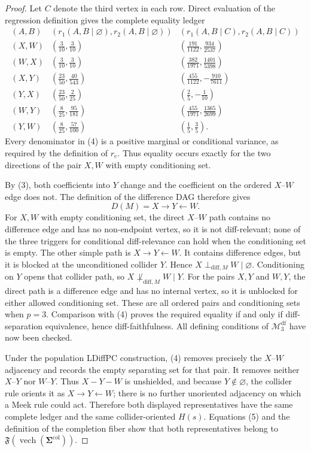 \documentclass{article}
\begin{document}
\begin{proof}
Let \(C\) denote the third vertex in each row. Direct evaluation of the regression definition gives the complete equality ledger
\[
\begin{array}{c|c|c}
 (A,B)&(r_1(A,B\mid\varnothing),r_2(A,B\mid\varnothing))
 &(r_1(A,B\mid C),r_2(A,B\mid C))\\ \hline
 (X,W)&(\frac3{10},\frac3{10})&(\frac{191}{1122},\frac{934}{2537})\\
 (W,X)&(\frac3{10},\frac3{10})&(\frac{382}{1971},\frac{1401}{5398})\\
 (X,Y)&(\frac{23}{50},\frac{40}{543})&(\frac{455}{1122},-\frac{910}{7611})\\
 (Y,X)&(\frac{23}{50},\frac2{25})&(\frac25,-\frac1{10})\\
 (W,Y)&(\frac8{25},\frac{95}{181})&(\frac{455}{1971},\frac{1365}{2699})\\
 (Y,W)&(\frac8{25},\frac{57}{100})&(\frac15,\frac35).
\end{array}
\tag{4}
\]
Every denominator in (4) is a positive marginal or conditional variance, as required by the definition of \(r_e\). Thus equality occurs exactly for the two directions of the pair \(X,W\) with empty conditioning set.

By (3), both coefficients into \(Y\) change and the coefficient on the ordered \(X\)--\(W\) edge does not. The definition of the difference DAG therefore gives
\[
 D(M)=X\longrightarrow Y\longleftarrow W.
 \tag{5}
\]
For \(X,W\) with empty conditioning set, the direct \(X\)--\(W\) path contains no difference edge and has no non-endpoint vertex, so it is not diff-relevant; none of the three triggers for conditional diff-relevance can hold when the conditioning set is empty. The other simple path is \(X\to Y\leftarrow W\). It contains difference edges, but it is blocked at the unconditioned collider \(Y\). Hence \(X\perp_{\mathrm{diff},M}W\mid\varnothing\). Conditioning on \(Y\) opens that collider path, so \(X\not\perp_{\mathrm{diff},M}W\mid Y\). For the pairs \(X,Y\) and \(W,Y\), the direct path is a difference edge and has no internal vertex, so it is unblocked for either allowed conditioning set. These are all ordered pairs and conditioning sets when \(p=3\). Comparison with (4) proves the required equality if and only if diff-separation equivalence, hence diff-faithfulness. All defining conditions of \(\mathcal M_3^{\mathrm{df}}\) have now been checked.

Under the population LDiffPC construction, (4) removes precisely the \(X\)--\(W\) adjacency and records the empty separating set for that pair. It removes neither \(X\)--\(Y\) nor \(W\)--\(Y\). Thus \(X-Y-W\) is unshielded, and because \(Y\notin\varnothing\), the collider rule orients it as \(X\to Y\leftarrow W\); there is no further unoriented adjacency on which a Meek rule could act. Therefore both displayed representatives have the same complete ledger and the same collider-oriented \(H(s)\). Equations (5) and the definition of the completion fiber show that both representatives belong to \(\mathfrak F(\operatorname{vech}(\boldsymbol\Sigma^{\mathrm{col}}))\).


\end{proof}
\end{document}
